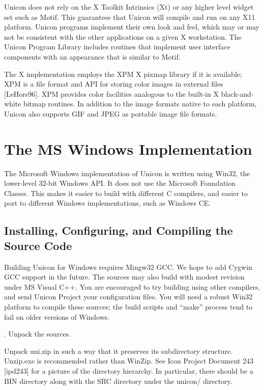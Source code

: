 Unicon does not rely on the X Toolkit Intrinsics (Xt) or any higher
level widget set such as Motif. This guarantees that Unicon will
compile and run on any X11 platform. Unicon programs implement their
own look and feel, which may or may not be consistent with the other
applications on a given X workstation. The Unicon Program Library
includes routines that implement user interface components with an
appearance that is similar to Motif.

The X implementation employs the XPM X pixmap library if it is
available; XPM is a file format and API for storing color
images in external files [LeHors96]. XPM provides color facilities
analogous to the built-in X black-and-white bitmap routines. In
addition to the image formats native to each platform, Unicon also
supports GIF and JPEG as portable image file formats.

\section{The MS Windows Implementation}

The Microsoft Windows implementation of Unicon is written using Win32,
the lower-level 32-bit Windows API. It does not use the Microsoft
Foundation Classes. This makes it easier to build with different C
compilers, and easier to port to different Windows implementations,
such as Windows CE.

\subsection{Installing, Configuring, and Compiling the Source Code}

Building Unicon for Windows requires Mingw32 GCC. We hope to add
Cygwin GCC support in the future. The sources may also build with
modest revision under MS Visual C++. You are encouraged to try
building using other compilers, and send Unicon Project your
configuration files. You will need a robust Win32 platform to compile
these sources; the build scripts and ``make'' process tend to fail on
older versions of Windows.

{. Unpack the sources.}

Unpack uni.zip in such a way that it preserves its subdirectory
structure. Unzip.exe is recommended rather than WinZip.  See Icon
Project Document 243 [ipd243] for a picture of the directory
hierarchy. In particular, there should be a BIN directory along with
the SRC directory under the unicon/ directory.

